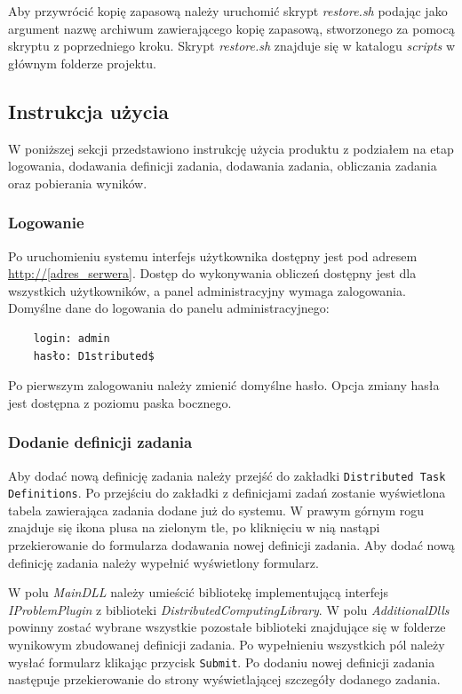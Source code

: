 \documentclass[a4paper,11pt,twoside]{report}
\theoremstyle{definition}
\begin{document}
            Aby przywrócić kopię zapasową należy uruchomić skrypt \textit{restore.sh} podając jako argument nazwę archiwum zawierającego kopię zapasową, stworzonego za pomocą skryptu z poprzedniego kroku. Skrypt \textit{restore.sh} znajduje się w katalogu \textit{scripts} w głównym folderze projektu.
            
    \subsection{Instrukcja użycia}
        W poniższej sekcji przedstawiono instrukcję użycia produktu z podziałem na etap logowania, dodawania definicji zadania, dodawania zadania, obliczania zadania oraz pobierania wyników.
        
        \subsubsection{Logowanie}
        
        Po uruchomieniu systemu interfejs użytkownika dostępny jest pod adresem \url{http://[adres_serwera]}. Dostęp do wykonywania obliczeń dostępny jest dla wszystkich użytkowników, a panel administracyjny wymaga zalogowania.
        Domyślne dane do logowania do panelu administracyjnego:

        \begin{verbatim}
    login: admin
    hasło: D1stributed$
        \end{verbatim}


        Po pierwszym zalogowaniu należy zmienić domyślne hasło. Opcja zmiany hasła jest dostępna z poziomu paska bocznego.
        
        \subsubsection{Dodanie definicji zadania}
        \label{distributed-task-definition-add-guide}
        
        Aby dodać nową definicję zadania należy przejść do zakładki \texttt{Distributed Task Definitions}. 
        Po przejściu do zakładki z definicjami zadań zostanie wyświetlona tabela zawierająca zadania dodane już do systemu. 
        W prawym górnym rogu znajduje się ikona plusa na zielonym tle, po kliknięciu w nią nastąpi przekierowanie do formularza dodawania nowej definicji zadania.
        Aby dodać nową definicję zadania należy wypełnić wyświetlony formularz.
        
        W polu \textit{MainDLL} należy umieścić bibliotekę implementującą interfejs \textit{IProblemPlugin} z biblioteki \textit{DistributedComputingLibrary}.
        W polu \textit{AdditionalDlls} powinny zostać wybrane wszystkie pozostałe biblioteki znajdujące się w folderze wynikowym zbudowanej definicji zadania.
        Po wypełnieniu wszystkich pól należy wysłać formularz klikając przycisk \texttt{Submit}.
        Po dodaniu nowej definicji zadania następuje przekierowanie do strony wyświetlającej szczegóły dodanego zadania. 
        
\end{document}
